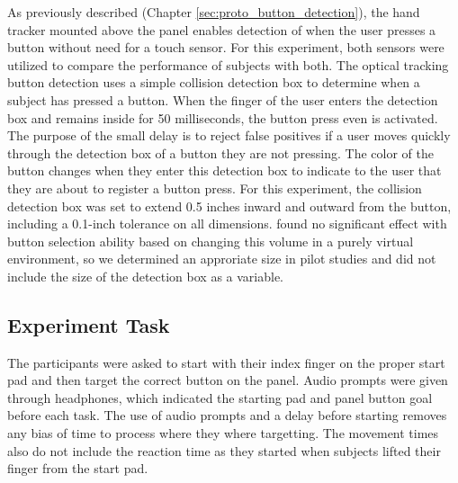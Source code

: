 As previously described (Chapter \ref{sec:proto_button_detection}), the hand tracker mounted above the panel enables detection of when the user presses a button without need for a touch sensor.
For this experiment, both sensors were utilized to compare the performance of subjects with both.
The optical tracking button detection uses a simple collision detection box to determine when a subject has pressed a button.
When the finger of the user enters the detection box and remains inside for 50 milliseconds, the button press even is activated.
The purpose of the small delay is to reject false positives if a user moves quickly through the detection box of a button they are not pressing.
The color of the button changes when they enter this detection box to indicate to the user that they are about to register a button press.
For this experiment, the collision detection box was set to extend 0.5 inches inward and outward from the button, including a 0.1-inch tolerance on all dimensions.
\citet{t._aslandere_virtual_2015} found no significant effect with button selection ability based on changing this volume in a purely virtual environment, so we determined an approriate size in pilot studies and did not include the size of the detection box as a variable.

\subsection{Experiment Task}

The participants were asked to start with their index finger on the proper start pad and then target the correct button on the panel.
Audio prompts were given through headphones, which indicated the starting pad and panel button goal before each task.
The use of audio prompts and a delay before starting removes any bias of time to process where they where targetting.
The movement times also do not include the reaction time as they started when subjects lifted their finger from the start pad.

